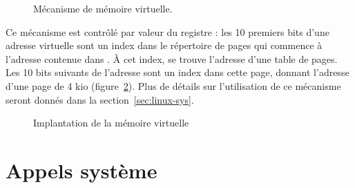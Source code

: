 \begin{figure}[h] %
\centering
{}
\caption{Mécanisme de mémoire virtuelle.}
\label{fig:memoire-virtuelle}
\end{figure} %

\label{page:mem-virt}
Ce mécanisme est contrôlé par valeur du registre \crtrois: les 10 premiers bits
d'une adresse virtuelle sont un index dans le répertoire de pages qui commence à
l'adresse contenue dans \crtrois. À cet index, se trouve l'adresse d'une table
de pages. Les 10 bits suivants de l'adresse sont un index dans cette page,
donnant l'adresse d'une page de 4 kio (figure~\ref{fig:pagetables}).
Plus de détails sur l'utilisation de ce mécanisme seront donnés dans la
section~\ref{sec:linux-sys}.

\begin{figure}[h]

\caption{Implantation de la mémoire virtuelle}
\label{fig:pagetables}
\end{figure}

\section{Appels système}

